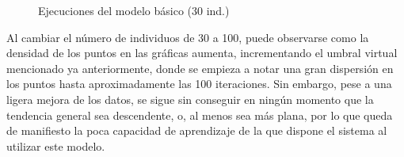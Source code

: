 \documentclass[11pt,spanish,listoffigures,listoftables]{tfgetsinf}
\begin{document}
\begin{figure}[!htb]
\begin{subfigure}[b]{0.43\textwidth}
{}
\end{subfigure}
\caption{Ejecuciones del modelo básico (30 ind.)}
\label{fig:basic_simulation_res_30}
\end{figure}


Al cambiar el número de individuos de 30 a 100, puede observarse como la densidad de los puntos en las gráficas aumenta, incrementando el umbral virtual mencionado ya anteriormente, donde se empieza a notar una gran dispersión en los puntos hasta aproximadamente las 100 iteraciones. Sin embargo, pese a una ligera mejora de los datos, se sigue sin conseguir en ningún momento que la tendencia general sea descendente, o, al menos sea más plana, por lo que queda de manifiesto la poca capacidad de aprendizaje de la que dispone el sistema al utilizar este modelo.
\end{document}
